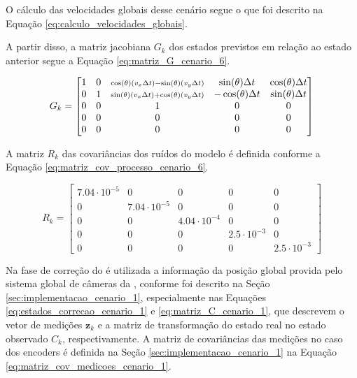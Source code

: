 \documentclass[acronym, symbols, table]{fei}
\begin{document}
			O cálculo das velocidades globais desse cenário segue o que foi descrito na Equação \eqref{eq:calculo_velocidades_globais}.
			
			A partir disso, a matriz jacobiana $G_{k}$ dos estados previstos em relação ao estado anterior segue a Equação \eqref{eq:matriz_G_cenario_6}.
			
			\renewcommand{\arraystretch}{1.2}
			\begin{equation}\label{eq:matriz_G_cenario_6}
				G_k = 
				\begin{bmatrix}
					1 & 0 & 
					\smash{\scriptstyle 
						\cos(\theta)\left( v_x \Delta t \right) 
						- \sin(\theta)\left( v_y \Delta t \right)} 
					& \sin(\theta) \Delta t 
					& \cos(\theta) \Delta t 
					\\
					0 & 1 & 
					\smash{\scriptstyle 
						\sin(\theta)\left( v_x \Delta t \right) 
						+ \cos(\theta)\left( v_y \Delta t \right)} 
					& -\cos(\theta) \Delta t 
					& \sin(\theta) \Delta t 
					\\
					0 & 0 & 1 & 0 & 0 \\
					0 & 0 & 0 & 0 & 0 \\
					0 & 0 & 0 & 0 & 0 \\
				\end{bmatrix}
			\end{equation}
		
			A matriz $R_k$ das covariâncias dos ruídos do modelo é definida conforme a Equação \eqref{eq:matriz_cov_processo_cenario_6}.
			
			\begin{equation}\label{eq:matriz_cov_processo_cenario_6}
				R_{k} = \begin{bmatrix}
					7.04\cdot10^{-5} & 0 & 0 & 0 & 0 \\
					0 & 7.04\cdot10^{-5} & 0 & 0 & 0 \\
					0 & 0 & 4.04\cdot10^{-4} & 0 & 0 \\
					0 & 0 & 0 & 2.5\cdot10^{-3} & 0 \\
					0 & 0 & 0 & 0 & 2.5\cdot10^{-3}
				\end{bmatrix}
			\end{equation}
		
			Na fase de correção do  é utilizada a informação da posição global provida pelo sistema global de câmeras da , conforme foi descrito na Seção \ref{sec:implementacao_cenario_1}, especialmente nas Equações \eqref{eq:estados_correcao_cenario_1} e \eqref{eq:matriz_C_cenario_1}, que descrevem o vetor de medições $\textbf{z}_{k}$ e a matriz de transformação do estado real no estado observado $C_{k}$, respectivamente. A matriz de covariâncias das medições no caso dos encoders é definida na Seção \ref{sec:implementacao_cenario_1} na Equação \eqref{eq:matriz_cov_medicoes_cenario_1}.
			
\end{document}

